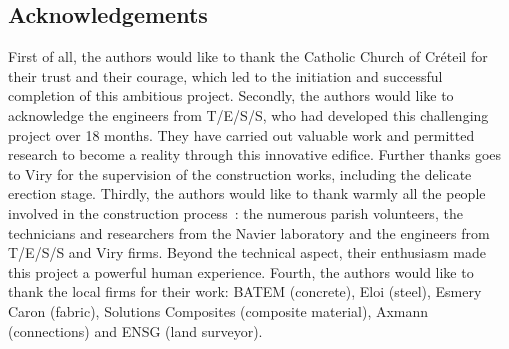 \subsection*{Acknowledgements}
First of all, the authors would like to thank the Catholic Church of Créteil for their trust and their courage, which led to the initiation and successful completion of this ambitious project. Secondly, the authors would like to acknowledge the engineers from T/E/S/S, who had developed this challenging project over 18 months. They have carried out valuable work and permitted research to become a reality through this innovative edifice. Further thanks goes to Viry for the supervision of the construction works, including the delicate erection stage. Thirdly, the authors would like to thank warmly all the people involved in the construction process~: the numerous parish volunteers, the technicians and researchers from the Navier laboratory and the engineers from T/E/S/S and Viry firms. Beyond the technical aspect, their enthusiasm made this project a powerful human experience. Fourth, the authors would like to thank the local firms for their work: BATEM (concrete), Eloi (steel), Esmery Caron (fabric), Solutions Composites (composite material), Axmann (connections) and ENSG (land surveyor).